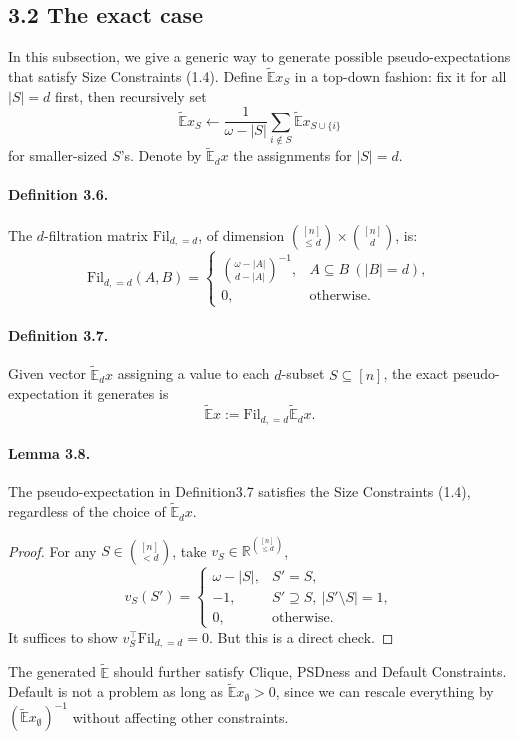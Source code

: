 \subsection*{3.2 The exact case}
In this subsection, we give a generic way to generate possible pseudo-expectations that satisfy Size Constraints (1.4). Define $\widetilde{\mathbb E}x_S$ in a top-down fashion: fix it for all $|S|=d$ first, then recursively set
\[\widetilde{\mathbb E}x_S\leftarrow\frac1{\omega-|S|}\sum_{i\notin S}\widetilde{\mathbb E}x_{S\cup\{i\}}\tag{3.13}\]
for smaller-sized $S$'s. Denote by $\widetilde{\mathbb E}_dx$ the assignments for $|S|=d$.
\paragraph{Definition 3.6.} The $d$-filtration matrix $\mathrm{Fil}_{d,=d}$, of dimension $\binom{[n]}{\le d}\times\binom{[n]}d$, is:
\[\mathrm{Fil}_{d,=d}(A,B)=\begin{cases}\binom{\omega-|A|}{d-|A|}^{-1},&A\subseteq B\ (|B|=d),\\0,&\text{otherwise}.\end{cases}\tag{3.14}\]
\paragraph{Definition 3.7.} Given vector $\widetilde{\mathbb E}_dx$ assigning a value to each $d$-subset $S\subseteq[n]$, the exact pseudo-expectation it generates is
\[\widetilde{\mathbb E}x:=\mathrm{Fil}_{d,=d}\widetilde{\mathbb E}_dx.\tag{3.15}\]
\paragraph{Lemma 3.8.} The pseudo-expectation in Definition3.7 satisfies the Size Constraints (1.4), regardless of the choice of $\widetilde{\mathbb E}_dx$.
\begin{proof}For any $S\in\binom{[n]}{<d}$, take $v_S\in\mathbb R^{\binom{[n]}{\le d}}$,
\[v_S(S')=\begin{cases}\omega-|S|,&S'=S,\\-1,&S'\supseteq S,\ |S'\setminus S|=1,\\0,&\text{otherwise}.
\end{cases}\]
It suffices to show $v_S^\top\mathrm{Fil}_{d,=d}=0$. But this is a direct check.\end{proof}
The generated $\widetilde{\mathbb E}$ should further satisfy Clique, PSDness and Default Constraints. Default is not a problem as long as $\widetilde{\mathbb E}x_\emptyset>0$, since we can rescale everything by $(\widetilde{\mathbb E}x_\emptyset)^{-1}$ without affecting other constraints.
